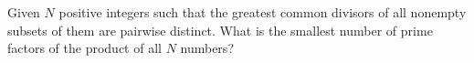 Given $N$ positive integers such that the greatest common divisors of all nonempty subsets of them are pairwise distinct. What is the smallest number of prime factors of the product of all $N$ numbers?